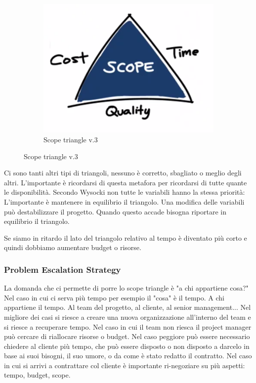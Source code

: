 \begin{figure}[H]
\begin{subfigure}{.3\textwidth}
		\centering
		\includegraphics[width=\linewidth]{document/img/triangle3.PNG}
		\caption{Scope triangle v.3}
	\end{subfigure}
\end{figure}

\noindent Ci sono tanti altri tipi di triangoli, nessuno è corretto, sbagliato o meglio degli altri. L'importante è ricordarsi di questa metafora per ricordarsi di tutte quante le disponibilità. Secondo Wysocki non tutte le variabili hanno la stessa priorità:
\noindent L'importante è mantenere in equilibrio il triangolo. Una modifica delle variabili può destabilizzare il progetto. Quando questo accade bisogna riportare in equilibrio il triangolo.
\begin{info}[Esempio]
	Se siamo in ritardo il lato del triangolo relativo al tempo è diventato più corto e quindi dobbiamo aumentare budget o risorse.
\end{info}
\subsubsection{Problem Escalation Strategy}
La domanda che ci permette di porre lo scope triangle è "a chi appartiene cosa?"\newline
Nel caso in cui ci serva più tempo per esempio il "cosa" è il tempo. A chi appartiene il tempo. Al team del progetto, al cliente, al senior management...
Nel migliore dei casi si riesce a creare una nuova organizzazione all'interno del team e si riesce a recuperare tempo. Nel caso in cui il team non riesca il project manager può cercare di riallocare risorse o budget. Nel caso peggiore può essere necessario chiedere al cliente più tempo, che può essere disposto o non disposto a darcelo in base ai suoi bisogni, il suo umore, o da come è stato redatto il contratto. Nel caso in cui si arrivi a contrattare col cliente è importante ri-negoziare su più aspetti: tempo, budget, scope.
